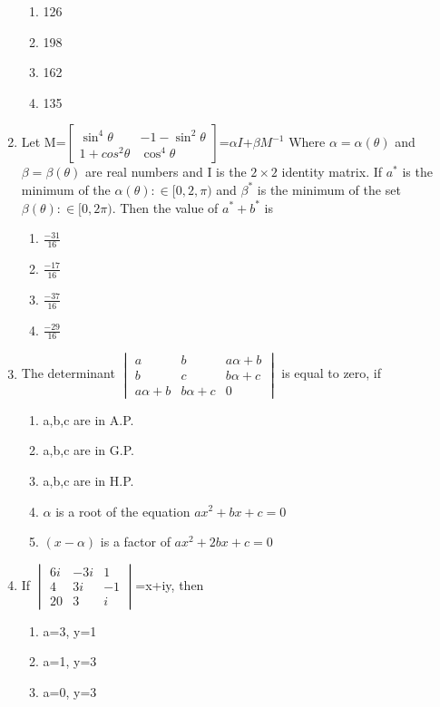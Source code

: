 \begin{enumerate}[label=\arabic*.,ref=\thesubsection.\theenumi]
\begin{enumerate}
 \item 126
 \item 198
 \item 162
 \item 135
\end{enumerate}
\item Let M=$\begin{bmatrix} \sin^4\theta & -1-\sin^2\theta \\ 1+cos^2\theta & \cos^4\theta \end{bmatrix}$=$\alpha I$+$\beta M^{-1}$ Where $\alpha=\alpha(\theta)$ and $\beta=\beta(\theta)$ are real numbers and I is the $2\times2$ identity matrix. If $a^*$ is the minimum of the ${\alpha(\theta): \in [0,2,\pi)}$ and $\beta^*$ is the minimum of the set ${\beta(\theta): \in [0,2\pi)}$. Then the value of $a^*+b^*$ is
\begin{enumerate}
 \item $\frac{-31}{16}$
 \item $\frac{-17}{16}$
 \item $\frac{-37}{16}$
 \item $\frac{-29}{16}$
\end{enumerate}
\item The determinant $\begin{vmatrix} a & b & a\alpha+b  \\ b & c & b\alpha+c \\ a\alpha+b & b\alpha+c & 0 \end{vmatrix}$ is equal to zero, if
\begin{enumerate}
 \item a,b,c are in A.P.
 \item a,b,c are in G.P.
 \item a,b,c are in H.P.
 \item$\alpha$ is a root of the equation $ax^2+bx+c=0$
 \item $(x-\alpha)$ is a factor of $ax^2+2bx+c=0$
\end{enumerate}
\item If $\begin{vmatrix} 6i &-3i & 1  \\ 4 & 3i& -1 \\ 20 &3 & i \end{vmatrix}$=x+iy, then
\begin{enumerate}
 \item a=3, y=1
 \item a=1, y=3
 \item a=0, y=3

\end{enumerate}
\end{enumerate}
